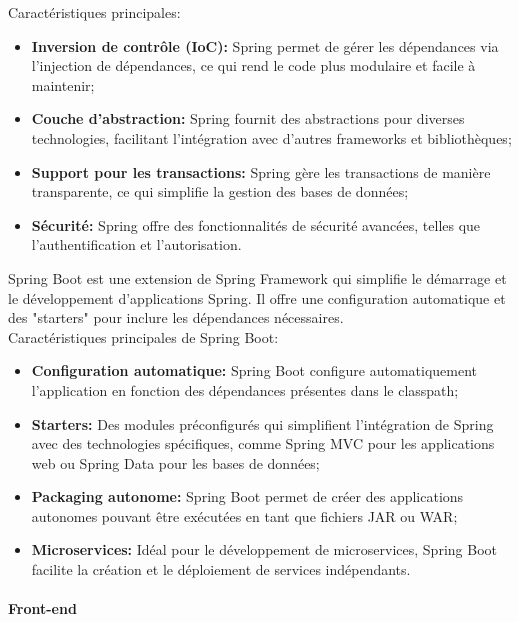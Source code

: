 \documentclass[12pt]{report}
\makeatletter
\renewcommand\subparagraph{\@startsection{subparagraph}{5}{\z@}{3.25ex \@plus1ex \@minus.2ex}{1ex \@plus.2ex}{\normalfont\normalsize\bfseries}} \renewcommand\thesubparagraph{$-$} \makeatother
\makeatother
\begin{document}
				Caractéristiques principales:
				
				\begin{itemize}
					\item \textbf{Inversion de contrôle (IoC):} Spring permet de gérer les dépendances via l'injection de dépendances, ce qui rend le code plus modulaire et facile à maintenir;
					\item \textbf{Couche d'abstraction:} Spring fournit des abstractions pour diverses technologies, facilitant l'intégration avec d'autres frameworks et bibliothèques;
					\item \textbf{Support pour les transactions:} Spring gère les transactions de manière transparente, ce qui simplifie la gestion des bases de données;
					\item \textbf{Sécurité:} Spring offre des fonctionnalités de sécurité avancées, telles que l'authentification et l'autorisation.
				\end{itemize}

				\subparagraph{Spring Boot}

				Spring Boot est une extension de Spring Framework qui simplifie le démarrage et le développement d'applications Spring. Il offre une configuration automatique et des "starters" pour inclure les dépendances nécessaires.\\

				Caractéristiques principales de Spring Boot:
				
				\begin{itemize}
					\item \textbf{Configuration automatique:} Spring Boot configure automatiquement l'application en fonction des dépendances présentes dans le classpath;
					\item \textbf{Starters:} Des modules préconfigurés qui simplifient l'intégration de Spring avec des technologies spécifiques, comme Spring MVC pour les applications web ou Spring Data pour les bases de données;
					\item \textbf{Packaging autonome:} Spring Boot permet de créer des applications autonomes pouvant être exécutées en tant que fichiers JAR ou WAR;
					\item \textbf{Microservices:} Idéal pour le développement de microservices, Spring Boot facilite la création et le déploiement de services indépendants.
				\end{itemize}

				\paragraph{Front-end}
\end{document}
